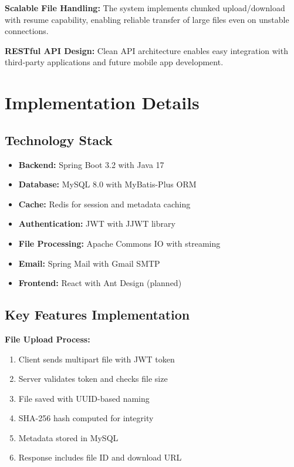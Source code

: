\documentclass[final]{cvpr}
\begin{document}
\textbf{Scalable File Handling:} The system implements chunked upload/download with resume capability, enabling reliable transfer of large files even on unstable connections.

\textbf{RESTful API Design:} Clean API architecture enables easy integration with third-party applications and future mobile app development.

\section{Implementation Details}

\subsection{Technology Stack}
\begin{itemize}
    \item \textbf{Backend:} Spring Boot 3.2 with Java 17
    \item \textbf{Database:} MySQL 8.0 with MyBatis-Plus ORM
    \item \textbf{Cache:} Redis for session and metadata caching
    \item \textbf{Authentication:} JWT with JJWT library
    \item \textbf{File Processing:} Apache Commons IO with streaming
    \item \textbf{Email:} Spring Mail with Gmail SMTP
    \item \textbf{Frontend:} React with Ant Design (planned)
\end{itemize}

\subsection{Key Features Implementation}

\textbf{File Upload Process:}
\begin{enumerate}
    \item Client sends multipart file with JWT token
    \item Server validates token and checks file size
    \item File saved with UUID-based naming
    \item SHA-256 hash computed for integrity
    \item Metadata stored in MySQL
    \item Response includes file ID and download URL
\end{enumerate}
\end{document}
